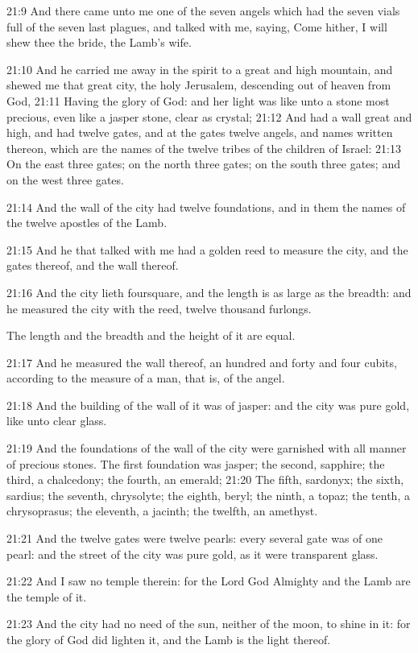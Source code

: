 21:9 And there came unto me one of the seven angels which had the seven vials full of the seven last plagues, and talked with me, saying, Come hither, I will shew thee the bride, the Lamb's wife.

21:10 And he carried me away in the spirit to a great and high mountain, and shewed me that great city, the holy Jerusalem, descending out of heaven from God, 21:11 Having the glory of God: and her light was like unto a stone most precious, even like a jasper stone, clear as crystal; 21:12 And had a wall great and high, and had twelve gates, and at the gates twelve angels, and names written thereon, which are the names of the twelve tribes of the children of Israel: 21:13 On the east three gates; on the north three gates; on the south three gates; and on the west three gates.

21:14 And the wall of the city had twelve foundations, and in them the names of the twelve apostles of the Lamb.

21:15 And he that talked with me had a golden reed to measure the city, and the gates thereof, and the wall thereof.

21:16 And the city lieth foursquare, and the length is as large as the breadth: and he measured the city with the reed, twelve thousand furlongs.

The length and the breadth and the height of it are equal.

21:17 And he measured the wall thereof, an hundred and forty and four cubits, according to the measure of a man, that is, of the angel.

21:18 And the building of the wall of it was of jasper: and the city was pure gold, like unto clear glass.

21:19 And the foundations of the wall of the city were garnished with all manner of precious stones. The first foundation was jasper; the second, sapphire; the third, a chalcedony; the fourth, an emerald; 21:20 The fifth, sardonyx; the sixth, sardius; the seventh, chrysolyte; the eighth, beryl; the ninth, a topaz; the tenth, a chrysoprasus; the eleventh, a jacinth; the twelfth, an amethyst.

21:21 And the twelve gates were twelve pearls: every several gate was of one pearl: and the street of the city was pure gold, as it were transparent glass.

21:22 And I saw no temple therein: for the Lord God Almighty and the Lamb are the temple of it.

21:23 And the city had no need of the sun, neither of the moon, to shine in it: for the glory of God did lighten it, and the Lamb is the light thereof.

